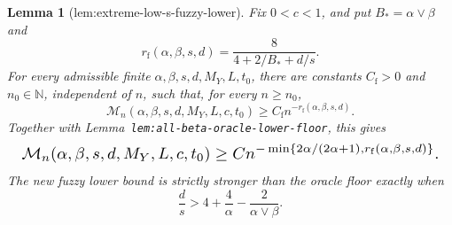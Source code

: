 \documentclass{article}
\newtheorem{lemma}{Lemma}
\begin{document}
\begin{lemma}[lem:extreme-low-s-fuzzy-lower]\label{lem:extreme-low-s-fuzzy-lower}
Fix \(0<c<1\), and put \(B_*=\alpha\vee\beta\) and
\[
r_{\mathrm f}(\alpha,\beta,s,d)
=
\frac{8}{4+2/B_*+d/s}.
\]
For every admissible finite \(\alpha,\beta,s,d,M_Y,L,t_0\), there are constants \(C_{\mathrm f}>0\) and \(n_0\in\mathbb N\), independent of \(n\), such that, for every \(n\ge n_0\),
\[
\mathcal M_n(\alpha,\beta,s,d,M_Y,L,c,t_0)
\ge C_{\mathrm f}n^{-r_{\mathrm f}(\alpha,\beta,s,d)}.
\]
Together with Lemma~\texttt{lem:all-beta-oracle-lower-floor}, this gives
\[
\makebox[\linewidth][c]{\resizebox{0.98\linewidth}{!}{\(\displaystyle \mathcal M_n(\alpha,\beta,s,d,M_Y,L,c,t_0)
\ge
C n^{-\min\{2\alpha/(2\alpha+1),r_{\mathrm f}(\alpha,\beta,s,d)\}}.\)}}
\]
The new fuzzy lower bound is strictly stronger than the oracle floor exactly when
\[
\frac ds>4+\frac4\alpha-\frac{2}{\alpha\vee\beta}.
\]
\end{lemma}
\end{document}
